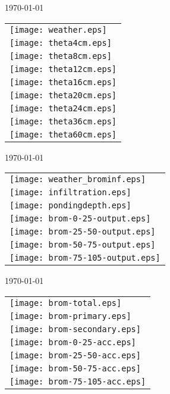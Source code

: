 \documentclass[a4paper]{article}
\begin{document}

\newpage
\today \\
%
\begin{tabular}{l}
\texttt{[image: weather.eps]} \\
\texttt{[image: theta4cm.eps]} \\
\texttt{[image: theta8cm.eps]} \\
\texttt{[image: theta12cm.eps]} \\
\texttt{[image: theta16cm.eps]} \\
\texttt{[image: theta20cm.eps]} \\
\texttt{[image: theta24cm.eps]} \\
\texttt{[image: theta36cm.eps]} \\
\texttt{[image: theta60cm.eps]}
\end{tabular}

\newpage
\today \\
%
\begin{tabular}{l}
\texttt{[image: weather\_brominf.eps]} \\
\texttt{[image: infiltration.eps]}\\
\texttt{[image: pondingdepth.eps]}\\
\texttt{[image: brom-0-25-output.eps]} \\
\texttt{[image: brom-25-50-output.eps]} \\
\texttt{[image: brom-50-75-output.eps]} \\
\texttt{[image: brom-75-105-output.eps]}
\end{tabular}

\newpage
\today \\
%
\begin{tabular}{l}
\texttt{[image: brom-total.eps]} \\
\texttt{[image: brom-primary.eps]} \\
\texttt{[image: brom-secondary.eps]} \\
\texttt{[image: brom-0-25-acc.eps]} \\
\texttt{[image: brom-25-50-acc.eps]} \\
\texttt{[image: brom-50-75-acc.eps]} \\
\texttt{[image: brom-75-105-acc.eps]}
\end{tabular}
\end{document}
